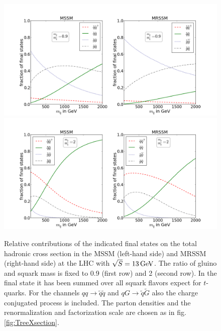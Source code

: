 \begin{figure}[!htpb]
\begin{center}
\includegraphics[scale=.45]{figures/rel_weights_mr=0,9_MSSM+MRSSM}
\includegraphics[scale=.45]{figures/rel_weights_mr=2_MSSM+MRSSM}
\caption{Relative contributions of the indicated final states on the total hadronic cross section in the MSSM (left-hand side) and MRSSM (right-hand side) at the LHC with $\sqrt{S} = \unit[13]{GeV}$. The ratio of gluino and squark mass is fixed to 0.9 (first row) and 2 (second row). In the final state it has been summed over all squark flavors expect for $t$-quarks. For the channels $qq \to \tilde{q}\tilde{q}$ and $qG \to \tilde{q}\tilde{G}$ also the charge conjugated process is included. The parton densities and the renormalization and factorization scale are chosen as in fig. \ref{fig:TreeXsection}.}\label{fig:TreeLevelSigma_0,9_2}
\end{center}
\end{figure}

